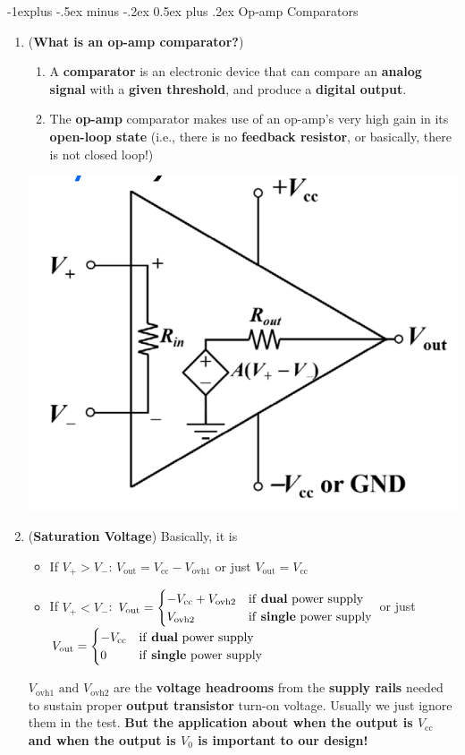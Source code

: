 \documentclass[10pt, landscape]{article}
\makeatletter
\renewcommand{\subsection}{\@startsection{subsection}{2}{0mm}%
                                {-1explus -.5ex minus -.2ex}%
                                {0.5ex plus .2ex}%
                                {\normalfont\normalsize\bfseries}}
\makeatother
\begin{document}
\begin{multicols}{4}
\subsection{Op-amp Comparators}
\begin{enumerate}
    \item (\textbf{What is an op-amp comparator?})
    \begin{enumerate}
        \item A \textbf{comparator} is an electronic device that can compare an \textbf{analog signal} with a \textbf{given threshold}, and produce a \textbf{digital output}.
        \item The \textbf{op-amp} comparator makes use of an op-amp's very high gain in its \textbf{open-loop state} (i.e., there is no \textbf{feedback resistor}, or basically, there is not closed loop!)
    \end{enumerate}
    \centerline{\includegraphics[width=0.5\linewidth]{images/comparator.png}}
    \item (\textbf{Saturation Voltage}) Basically, it is
    \begin{itemize}
        \item If $V_+>V_-$: $V_{\text{out}}=V_{\text{cc}}-V_{\text{ovh1}}$ or just $V_{\text{out}}=V_{\text{cc}}$
        \item If $V_+<V_-$: $V_{\text{out}}=\begin{cases}
            -V_{\text{cc}}+V_{\text{ovh2}} & \text{if \textbf{dual} power supply} \\
            V_{\text{ovh2}} & \text{if \textbf{single} power supply}
        \end{cases}$
        or just $V_{\text{out}}=\begin{cases}
            -V_{\text{cc}} & \text{if \textbf{dual} power supply} \\
            0 & \text{if \textbf{single} power supply}
        \end{cases}$
    \end{itemize}
    $V_{\text{ovh1}} \text{ and } V_{\text{ovh2}}$ are the \textbf{voltage headrooms} from the \textbf{supply rails} needed to sustain proper \textbf{output transistor} turn-on voltage. Usually we just ignore them in the test. \textbf{But the application about when the output is $V_{\text{cc}}$ and when the output is $V_0$ is important to our design!}

\end{enumerate}
\end{multicols}
\end{document}
